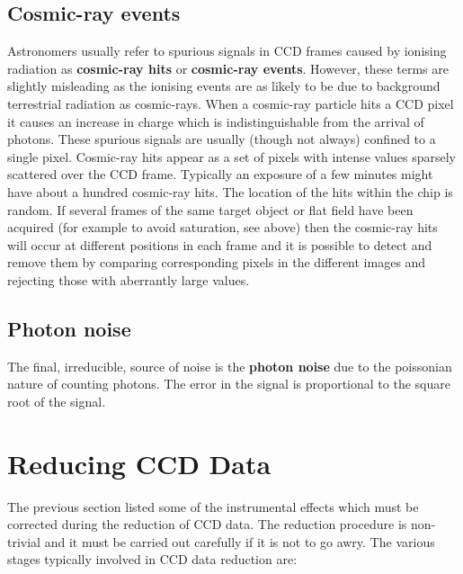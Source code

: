 \documentclass[twoside,11pt]{starlink}
\begin{document}
\subsection{Cosmic-ray events}

Astronomers usually refer to spurious signals in CCD frames caused by
ionising radiation as \textbf{cosmic-ray hits} or \textbf{cosmic-ray events}.
However, these terms are slightly misleading as the ionising events are
as likely to be due to background terrestrial radiation as cosmic-rays.
When a cosmic-ray particle hits a CCD pixel it causes an increase in
charge which is indistinguishable from the arrival of photons.  These
spurious signals are usually (though not always) confined to a single
pixel.  Cosmic-ray hits appear as a set of pixels with intense values
sparsely scattered over the CCD frame.  Typically an exposure of a few
minutes might have about a hundred cosmic-ray hits.  The location of the
hits within the chip is random.  If several frames of the same target
object or flat field have been acquired (for example to avoid saturation,
see above) then the cosmic-ray hits will occur at different positions in
each frame and it is possible to detect and remove them by comparing
corresponding pixels in the different images and rejecting those with
aberrantly large values.

\subsection{Photon noise}

The final, irreducible, source of noise is the \textbf{photon noise} due to
the poissonian nature of counting photons.  The error in the signal is
proportional to the square root of the signal.


\section{\label{REDUCE}Reducing CCD Data}

The previous section listed some of the instrumental effects which must
be corrected during the reduction of CCD data.  The reduction procedure
is non-trivial and it must be carried out carefully if it is not to go
awry.  The various stages typically involved in CCD data reduction are:
\end{document}
